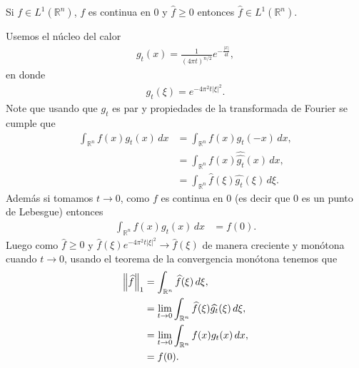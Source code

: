 \begin{homeworkProblem}
  Si $f\in L^1(\mathbb{R}^{n})$, $f$ es continua en $0$ y $\hat{f}\geq 0$ entonces $\hat{f}\in L^{1}(\mathbb{R}^{n})$. 
  \begin{solution}
    Usemos el núcleo del calor
    \begin{align*}
      g_{t}(x)=\frac{1}{(4\pi t)^{n/2}}e^{-\frac{|x|}{4t}},
    \end{align*}
    en donde
    \begin{align*}
      \hat{g_t}(\xi)=e^{-4\pi^2t|\xi|^2}.
    \end{align*}
    Note que usando que $g_t$ es par y propiedades de la transformada de Fourier se cumple que 
    \begin{align*}
      \int_{\mathbb{R}^{n}}f(x)g_{t}(x)\, dx&=\int_{\mathbb{R}^{n}}f(x)g_{t}(-x)\, dx,\\
      &=\int_{\mathbb{R}^{n}}f(x)\hat{\hat{g_{t}}}(x)\, dx,\\
      &=\int_{\mathbb{R}^{n}}\hat{f}(\xi)\hat{g_t}(\xi)\, d\xi.
    \end{align*}
    Además si tomamos $t\to 0$, como $f$ es continua en $0$ (es decir que $0$ es un punto de Lebesgue) entonces
    \begin{align*}
      \int_{\mathbb{R}^{n}}f(x)g_t(x)\, dx&=f(0).
    \end{align*}
    Luego como $\hat{f}\geq 0$ y $\hat{f}(\xi)e^{-4\pi^2t|\xi|^2}\to \hat{f}(\xi)$ de manera creciente y monótona cuando $t\to 0$, usando el teorema de la convergencia monótona tenemos que 
    \begin{align*}
      \left\|\widehat{f}\right\|_{1}&=\int_{\mathbb{R}^{n}}\widehat{f}(\xi)\, d\xi,\\
      &=\lim_{t \to 0}\int_{\mathbb{R}^{n}}\widehat{f}(\xi)\widehat{g_{t}}(\xi)\, d\xi,\\
      &=\lim_{t \to 0}\int_{\mathbb{R}^{n}}f(x)g_t(x)\, dx,\\
      &=f(0).
    \end{align*}
  \end{solution}
\end{homeworkProblem}

